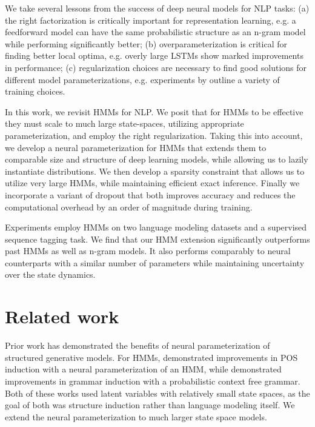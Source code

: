 \documentclass[11pt,a4paper]{article}
\begin{document}
We take several lessons from the success of deep neural models for NLP tasks:
(a) the right factorization is critically important for representation learning, e.g. a feedforward model \citet{bengio2003nlm}
can have the same probabilistic structure as an n-gram model while performing significantly better;
(b) overparameterization is critical for finding better local optima,
e.g. overly large LSTMs \citet{zaremba2014lstm} show marked improvements in performance;
(c) regularization choices are necessary to find good solutions for different model parameterizations,
e.g. experiments by \citet{merity2017awdlstm} outline a variety of training choices.

In this work, we revisit HMMs for NLP. We posit that for HMMs to be 
effective they must scale to much large state-spaces, utilizing appropriate parameterization, and 
employ the right regularization. Taking this into account, we develop a neural parameterization for HMMs that extends 
them to comparable size and structure of deep learning models,
while allowing us to lazily instantiate distributions.
We then develop a sparsity constraint that allows us to utilize very large HMMs,
while maintaining efficient exact inference.
Finally we incorporate a variant of dropout that both improves accuracy
and reduces the computational overhead by an order of magnitude during training. 

Experiments employ HMMs on two language modeling datasets and a supervised sequence tagging task.
We find that our HMM extension significantly outperforms past HMMs as well as n-gram models. 
It also performs comparably to neural counterparts with a similar number of parameters
while maintaining uncertainty over the state dynamics.

\section{Related work}

Prior work has demonstrated the benefits of neural parameterization of structured generative models. 
For HMMs, \citet{tran2016hmm} demonstrated improvements in POS induction with a
neural parameterization of an HMM,
while \citet{kim2019cpcfg} demonstrated improvements in grammar induction with
a probabilistic context free grammar.
Both of these works used latent variables with relatively small state spaces,
as the goal of both was structure induction rather than language modeling itself.
We extend the neural parameterization to much larger state space models.
\end{document}
